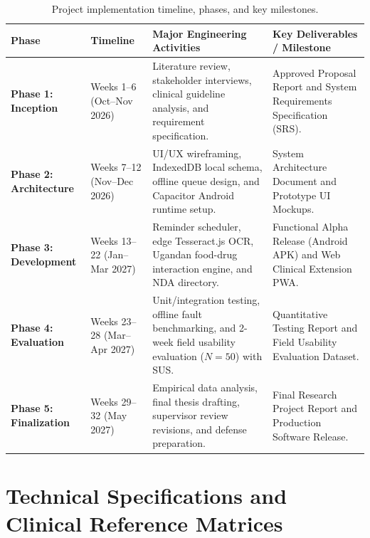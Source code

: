 \begin{table}[!htbp]
  \centering
  \caption{Project implementation timeline, phases, and key milestones.}
  \label{tab:workplan_milestones}
  \footnotesize
  \setlength{\tabcolsep}{3.5pt}
  \begin{tabularx}{\textwidth}{@{} >{\raggedright\arraybackslash}p{2.4cm} >{\raggedright\arraybackslash}p{2.0cm} >{\raggedright\arraybackslash}X >{\raggedright\arraybackslash}p{3.6cm} @{}}
    \toprule
    \textbf{Phase} & \textbf{Timeline} & \textbf{Major Engineering Activities} & \textbf{Key Deliverables / Milestone} \\
    \midrule
    \textbf{Phase 1: Inception} & Weeks 1--6 \newline (Oct--Nov 2026) & Literature review, stakeholder interviews, clinical guideline analysis, and requirement specification. & Approved Proposal Report and System Requirements Specification (SRS). \\
    \midrule
    \textbf{Phase 2: Architecture} & Weeks 7--12 \newline (Nov--Dec 2026) & UI/UX wireframing, IndexedDB local schema, offline queue design, and Capacitor Android runtime setup. & System Architecture Document and Prototype UI Mockups. \\
    \midrule
    \textbf{Phase 3: Development} & Weeks 13--22 \newline (Jan--Mar 2027) & Reminder scheduler, edge Tesseract.js OCR, Ugandan food-drug interaction engine, and NDA directory. & Functional Alpha Release (Android APK) and Web Clinical Extension PWA. \\
    \midrule
    \textbf{Phase 4: Evaluation} & Weeks 23--28 \newline (Mar--Apr 2027) & Unit/integration testing, offline fault benchmarking, and 2-week field usability evaluation ($N=50$) with SUS. & Quantitative Testing Report and Field Usability Evaluation Dataset. \\
    \midrule
    \textbf{Phase 5: Finalization} & Weeks 29--32 \newline (May 2027) & Empirical data analysis, final thesis drafting, supervisor review revisions, and defense preparation. & Final Research Project Report and Production Software Release. \\
    \bottomrule
  \end{tabularx}
\end{table}

\chapter{Technical Specifications and Clinical Reference Matrices}
\label{app:technical}

